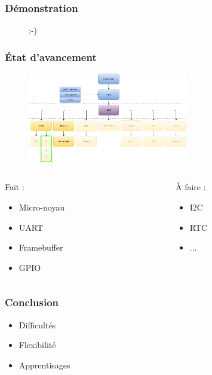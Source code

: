 \documentclass{beamer}
\begin{document}
\begin{frame}
\frametitle{Démonstration}
\begin{figure}[center]
\begin{Huge}
:-)
\end{Huge}
\end{figure}
\end{frame}

\begin{frame}
\frametitle{État d'avancement}

\begin{figure}[center]
\includegraphics[width=7cm,natwidth=915,natheight=511]{GrapheSpe-4.png}
\end{figure}

\begin{columns}[T]

\begin{column}{.30\textwidth}
Fait :
\begin{itemize}
\item Micro-noyau
\item UART
\item Framebuffer
\item GPIO
\end{itemize}
\end{column}

\begin{column}{.30\textwidth}
À faire :
\begin{itemize}
\item I2C
\item RTC
\item ...
\end{itemize}
\end{column}

\end{columns}
\end{frame}

\begin{frame}
\frametitle{Conclusion}
\begin{itemize}
\item Difficultés
\item Flexibilité
\item Apprentisages
\end{itemize}
\end{frame}
\end{document}
